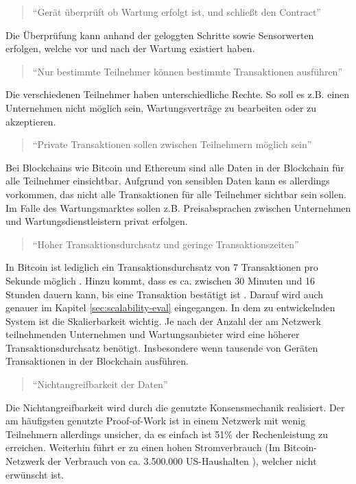 \begin{quote}
    ``Gerät überprüft ob Wartung erfolgt ist, und schließt den Contract''
\end{quote}

Die Überprüfung kann anhand der geloggten Schritte sowie Sensorwerten erfolgen, welche vor und nach der Wartung existiert haben.

\begin{quote}
    ``Nur bestimmte Teilnehmer können bestimmte Transaktionen ausführen''
\end{quote}

Die verschiedenen Teilnehmer haben unterschiedliche Rechte. So soll es z.B. einen Unternehmen nicht möglich sein, Wartungsverträge zu bearbeiten oder zu akzeptieren.

\begin{quote}
    ``Private Transaktionen sollen zwischen Teilnehmern möglich sein''
\end{quote}

Bei Blockchains wie Bitcoin und Ethereum sind alle Daten in der Blockchain für alle Teilnehmer einsichtbar. Aufgrund von sensiblen Daten kann es allerdings vorkommen, das nicht alle Transaktionen für alle Teilnehmer sichtbar sein sollen. Im Falle des Wartungsmarktes sollen z.B. Preisabsprachen zwischen Unternehmen und Wartungsdienstleistern privat erfolgen.

\begin{quote}
    ``Hoher Transaktionsdurchsatz und geringe Transaktionszeiten''
\end{quote}

In Bitcoin ist lediglich ein Transaktionsdurchsatz von 7 Transaktionen pro Sekunde möglich \cite{ZhengBlockchainChallengesOpportunities2017}. Hinzu kommt, dass es ca. zwischen 30 Minuten und 16 Stunden dauern kann, bis eine Transaktion bestätigt ist \cite{BuchkoHowLongBitcoin2017}. Darauf wird auch genauer im Kapitel \ref{sec:scalability-eval} eingegangen. In dem zu entwickelnden System ist die Skalierbarkeit wichtig. Je nach der Anzahl der am Netzwerk teilnehmenden Unternehmen und Wartungsanbieter wird eine höherer Transaktionsdurchsatz benötigt. Insbesondere wenn tausende von Geräten Transaktionen in der Blockchain ausführen.

\begin{quote}
    ``Nichtangreifbarkeit der Daten''
\end{quote}

Die Nichtangreifbarkeit wird durch die genutzte Konsensmechanik realisiert. Der am häufigsten genutzte Proof-of-Work ist in einem Netzwerk mit wenig Teilnehmern allerdings unsicher, da es einfach ist 51\% der Rechenleistung zu erreichen. Weiterhin führt er zu einen hohen Stromverbrauch (Im Bitcoin-Netzwerk der Verbrauch von ca. 3.500.000 US-Haushalten \cite{BitcoinEnergyConsumption}), welcher nicht erwünscht ist.

